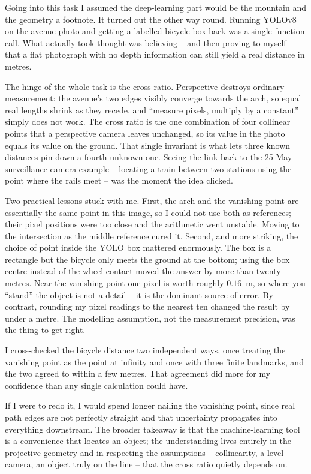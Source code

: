 \documentclass[11pt]{article}
\begin{document}
\titleline{\semester}

\noindent
Going into this task I assumed the deep-learning part would be the
mountain and the geometry a footnote. It turned out the other way round.
Running YOLOv8 on the avenue photo and getting a labelled bicycle box
back was a single function call. What actually took thought was believing
-- and then proving to myself -- that a flat photograph with no depth
information can still yield a real distance in metres.

The hinge of the whole task is the cross ratio. Perspective destroys
ordinary measurement: the avenue's two edges visibly converge towards the
arch, so equal real lengths shrink as they recede, and ``measure pixels,
multiply by a constant'' simply does not work. The cross ratio is the one
combination of four collinear points that a perspective camera leaves
unchanged, so its value in the photo equals its value on the ground. That
single invariant is what lets three known distances pin down a fourth
unknown one. Seeing the link back to the 25-May surveillance-camera
example -- locating a train between two stations using the point where the
rails meet -- was the moment the idea clicked.

Two practical lessons stuck with me. First, the arch and the vanishing
point are essentially the same point in this image, so I could not use
both as references; their pixel positions were too close and the
arithmetic went unstable. Moving to the intersection as the middle
reference cured it. Second, and more striking, the choice of point inside
the YOLO box mattered enormously. The box is a rectangle but the bicycle
only meets the ground at the bottom; using the box centre instead of the
wheel contact moved the answer by more than twenty metres. Near the
vanishing point one pixel is worth roughly $0.16$~m, so where you ``stand''
the object is not a detail -- it is the dominant source of error. By
contrast, rounding my pixel readings to the nearest ten changed the
result by under a metre. The modelling assumption, not the measurement
precision, was the thing to get right.

I cross-checked the bicycle distance two independent ways, once treating
the vanishing point as the point at infinity and once with three finite
landmarks, and the two agreed to within a few metres. That agreement did
more for my confidence than any single calculation could have.

If I were to redo it, I would spend longer nailing the vanishing point,
since real path edges are not perfectly straight and that uncertainty
propagates into everything downstream. The broader takeaway is that the
machine-learning tool is a convenience that locates an object; the
understanding lives entirely in the projective geometry and in respecting
the assumptions -- collinearity, a level camera, an object truly on the
line -- that the cross ratio quietly depends on.
\end{document}
